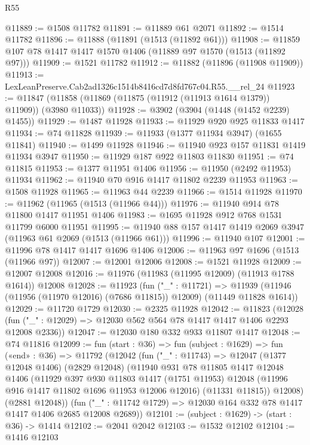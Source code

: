 \begin{lexlean}{R55}
\begin{coremodule}
{{@11889 := @1508 @11782
@11891 := @11889 @61 @2071
@11892 := @1514 @11782
@11896 := @11888 (@11891 (@1513 (@11892 @61)))
@11908 := @11859 @107 @78 @1417 @1417 @1570 @1406 (@11889 @97 @1570 (@1513 (@11892 @97)))
@11909 := @1521 @11782
@11912 := @11882 (@11896 (@11908 @11909))
@11913 := LexLeanPreserve.Cab2ad1326c1514b8416cd7d8fd767c04.R55.__rel_24
@11923 := @11847 (@11858 (@11869 (@11875 (@11912 (@11913 @1614 @1379)) @11909)) (@3980 @11033))
@11928 := @3902 (@3904 (@1448 (@1452 @2239) @1455))
@11929 := @1487 @11928
@11933 := @11929 @920 @925 @11833 @1417
@11934 := @74 @11828
@11939 := @11933 (@1377 @11934 @3947) (@1655 @11841)
@11940 := @1499 @11928
@11946 := @11940 @923 @157 @11831 @1419 @11934 @3947
@11950 := @11929 @187 @922 @11803 @11830
@11951 := @74 @11815
@11953 := @1377 @11951 @1406
@11956 := @11950 (@2492 @11953) @11934
@11962 := @11940 @70 @916 @1417 @11802 @2239 @11953
@11963 := @1508 @11928
@11965 := @11963 @44 @2239
@11966 := @1514 @11928
@11970 := @11962 (@11965 (@1513 (@11966 @44)))
@11976 := @11940 @914 @78 @11800 @1417 @11951 @1406
@11983 := @1695 @11928 @912 @768 @1531 @11799 @6000 @11951
@11995 := @11940 @88 @157 @1417 @1419 @2069 @3947 (@11963 @61 @2069 (@1513 (@11966 @61)))
@11996 := @11940 @107
@12001 := @11996 @78 @1417 @1417 @1696 @1406
@12006 := @11963 @97 @1696 (@1513 (@11966 @97))
@12007 := @12001 @12006
@12008 := @1521 @11928
@12009 := @12007 @12008
@12016 := @11976 (@11983 (@11995 @12009) (@11913 @1788 @1614)) @12008
@12028 := @11923
    (fun ("_" : @11721) =>
    @11939 (@11946 (@11956 (@11970 @12016) (@7686 @11815)) @12009) (@11449 @11828 @1614))
@12029 := @11720 @1729
@12030 := @2325 @11928
@12042 := @11823
    (@12028 (fun ("_" : @12029) => @12030 @562 @564 @78 @1417 @1417 @1406 @2293 @12008 @2336))
@12047 := @12030 @180 @332 @933 @11807 @1417
@12048 := @74 @11816
@12099 := fun (start : @36) =>
  fun (subject : @1629) =>
  fun («end» : @36) =>
  @11792
    (@12042
      (fun ("_" : @11743) =>
      @12047
        (@1377 @12048 @1406)
        (@2829 @12048)
        (@11940
          @931
          @78
          @11805
          @1417
          @12048
          @1406
          (@11929
            @397
            @930
            @11803
            @1417
            (@1751 @11953)
            @12048
            (@11996 @916 @1417 @11802 @1696 @11953 @12006 @12016)
            (@11331 @11815))
          @12008)
        (@2881 @12048))
      (fun ("_" : @11742 @1729) => @12030 @164 @332 @78 @1417 @1417 @1406 @2685 @12008 @2689))
@12101 := (subject : @1629) -> (start : @36) -> @1414
@12102 := @2041 @2042
@12103 := @1532 @12102
@12104 := @1416 @12103
}}
\end{coremodule}
\end{lexlean}
